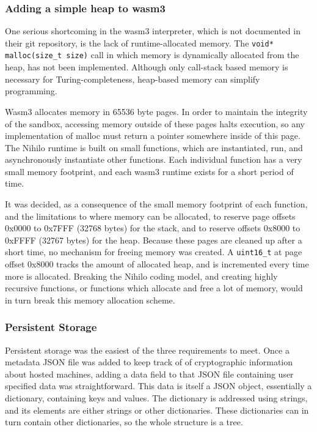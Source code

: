 \documentclass{article}
\begin{document}
\subsubsection{Adding a simple heap to wasm3}

One serious shortcoming in the wasm3 interpreter, which is not documented in their git repository, is the lack of runtime-allocated memory. The \texttt{void* malloc(size\_t size)} call in which memory is dynamically allocated from the heap, has not been implemented. Although only call-stack based memory is necessary for Turing-completeness, heap-based memory can simplify programming.

Wasm3 allocates memory in 65536 byte pages.
In order to maintain the integrity of the sandbox, accessing memory outside of these pages halts execution, so any implementation of malloc must return a pointer somewhere inside of this page. The Nihilo runtime is built on small functions, which are instantiated, run, and asynchronously instantiate other functions. Each individual function has a very small memory footprint, and each wasm3 runtime exists for a short period of time.

It was decided, as a consequence of the small memory footprint of each function, and the limitations to where memory can be allocated, to reserve page offsets 0x0000 to 0x7FFF (32768 bytes) for the stack, and to reserve offsets 0x8000 to 0xFFFF (32767 bytes) for the heap. Because these pages are cleaned up after a short time, no mechanism for freeing memory was created. A \texttt{uint16\_t} at page offset 0x8000 tracks the amount of allocated heap, and is incremented every time more is allocated. Breaking the Nihilo coding model, and creating highly recursive functions, or functions which allocate and free a lot of memory, would in turn break this memory allocation scheme.

\subsubsection{Persistent Storage}

Persistent storage was the easiest of the three requirements to meet. Once a metadata JSON file was added to keep track of of cryptographic information about hosted machines, adding a data field to that JSON file containing user specified data was straightforward. This data is itself a JSON object, essentially a dictionary, containing keys and values. The dictionary is addressed using strings, and its elements are either strings or other dictionaries. These dictionaries can in turn contain other dictionaries, so the whole structure is a tree.
\end{document}
